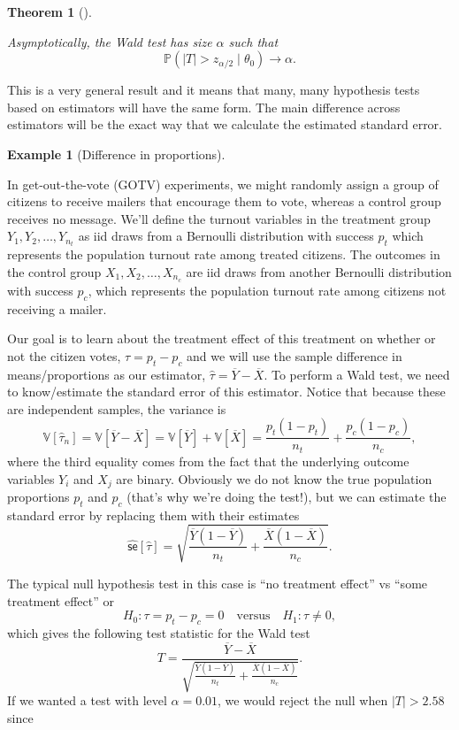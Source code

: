\documentclass[
  letterpaper,
  DIV=11,
  numbers=noendperiod]{scrreprt}
\newcommand{\V}{\mathbb{V}}
\renewcommand{\P}{\mathbb{P}}
\newcommand{\Xbar}{\overline{X}}
\newcommand{\Ybar}{\overline{Y}}
\theoremstyle{definition}
\theoremstyle{plain}
\newtheorem{theorem}{Theorem}[chapter]
\theoremstyle{definition}
\newtheorem{example}{Example}[chapter]
\theoremstyle{remark}
\begin{document}
\leavevmode{}%
\begin{theorem}[]\label{thm-wald}

Asymptotically, the Wald test has size \(\alpha\) such that \[ 
\P(|T| > z_{\alpha/2} \mid \theta_0) \to \alpha.
\]

\end{theorem}

This is a very general result and it means that many, many hypothesis
tests based on estimators will have the same form. The main difference
across estimators will be the exact way that we calculate the estimated
standard error.

\leavevmode{}%
\begin{example}[Difference in proportions]\label{exm-two-props}

In get-out-the-vote (GOTV) experiments, we might randomly assign a group
of citizens to receive mailers that encourage them to vote, whereas a
control group receives no message. We'll define the turnout variables in
the treatment group \(Y_{1}, Y_{2}, \ldots, Y_{n_t}\) as iid draws from
a Bernoulli distribution with success \(p_t\) which represents the
population turnout rate among treated citizens. The outcomes in the
control group \(X_{1}, X_{2}, \ldots, X_{n_c}\) are iid draws from
another Bernoulli distribution with success \(p_c\), which represents
the population turnout rate among citizens not receiving a mailer.

Our goal is to learn about the treatment effect of this treatment on
whether or not the citizen votes, \(\tau = p_t - p_c\) and we will use
the sample difference in means/proportions as our estimator,
\(\widehat{\tau} = \Ybar - \Xbar\). To perform a Wald test, we need to
know/estimate the standard error of this estimator. Notice that because
these are independent samples, the variance is \[ 
\V[\widehat{\tau}_n] =  \V[\Ybar - \Xbar] = \V[\Ybar] + \V[\Xbar] = \frac{p_t(1-p_t)}{n_t} + \frac{p_c(1-p_c)}{n_c},
\] where the third equality comes from the fact that the underlying
outcome variables \(Y_i\) and \(X_j\) are binary. Obviously we do not
know the true population proportions \(p_t\) and \(p_c\) (that's why
we're doing the test!), but we can estimate the standard error by
replacing them with their estimates \[ 
\widehat{\textsf{se}}[\widehat{\tau}] = \sqrt{\frac{\Ybar(1 -\Ybar)}{n_t} + \frac{\Xbar(1-\Xbar)}{n_c}}.
\]

The typical null hypothesis test in this case is ``no treatment effect''
vs ``some treatment effect'' or \[
H_0: \tau = p_t - p_c = 0 \quad\text{versus}\quad H_1: \tau \neq 0,
\] which gives the following test statistic for the Wald test \[
T = \frac{\Ybar - \Xbar}{\sqrt{\frac{\Ybar(1 -\Ybar)}{n_t} + \frac{\Xbar(1-\Xbar)}{n_c}}}. 
\] If we wanted a test with level \(\alpha = 0.01\), we would reject the
null when \(|T| > 2.58\) since


\end{example}
\end{document}
